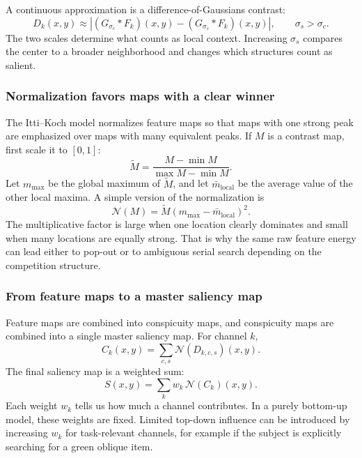 A continuous approximation is a difference-of-Gaussians contrast:
\[
D_k(x,y)
\approx
\left|
(G_{\sigma_c} * F_k)(x,y)
-
(G_{\sigma_s} * F_k)(x,y)
\right|,
\qquad
\sigma_s > \sigma_c .
\]
The two scales determine what counts as local context. Increasing \(\sigma_s\) compares the center to a broader neighborhood and changes which structures count as salient.

\subsubsection{Normalization favors maps with a clear winner}

The Itti--Koch model normalizes feature maps so that maps with one strong peak are emphasized over maps with many equivalent peaks. If \(M\) is a contrast map, first scale it to \([0,1]\):
\[
\widetilde M = \frac{M-\min M}{\max M-\min M}.
\]
Let \(m_{\max}\) be the global maximum of \(\widetilde M\), and let \(\bar m_{\mathrm{local}}\) be the average value of the other local maxima. A simple version of the normalization is
\[
\mathcal N(M)
=
\widetilde M
\left(m_{\max}-\bar m_{\mathrm{local}}\right)^2.
\]
The multiplicative factor is large when one location clearly dominates and small when many locations are equally strong. That is why the same raw feature energy can lead either to pop-out or to ambiguous serial search depending on the competition structure.

\subsubsection{From feature maps to a master saliency map}

Feature maps are combined into conspicuity maps, and conspicuity maps are combined into a single master saliency map. For channel \(k\),
\[
C_k(x,y)
=
\sum_{c,s}\mathcal N(D_{k,c,s})(x,y).
\]
The final saliency map is a weighted sum:
\[
S(x,y)
=
\sum_k w_k\,\mathcal N(C_k)(x,y).
\]
Each weight \(w_k\) tells us how much a channel contributes. In a purely bottom-up model, these weights are fixed. Limited top-down influence can be introduced by increasing \(w_k\) for task-relevant channels, for example if the subject is explicitly searching for a green oblique item.

